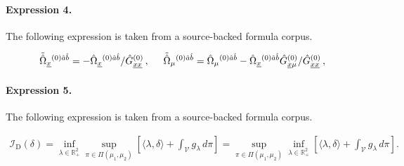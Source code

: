 \documentclass[11pt]{article}
\begin{document}
\paragraph{Expression 4.} The following expression is taken from a source-backed formula corpus.

\begin{align*}\tilde{\hat{\Omega}}_{\underline{x}}{}^{(0)\hat{a}\hat{b}} =-\hat{\Omega}_{\underline{x}}{}^{(0)\hat{a}\hat{b}} /\hat{G}_{\underline{xx}}^{(0)}\, ,\hspace{.5cm}\tilde{\hat{\Omega}}_{\mu}{}^{(0)\hat{a}\hat{b}} =\hat{\Omega}_{\mu}{}^{(0)\hat{a}\hat{b}}-\hat{\Omega}_{\underline{x}}{}^{(0)\hat{a}\hat{b}}\hat{G}_{\underline{x}\mu}^{(0)}/\hat{G}^{(0)}_{\underline{xx}}\, ,\end{align*}

\paragraph{Expression 5.} The following expression is taken from a source-backed formula corpus.

\begin{align*}\mathcal{I}_{\mathrm{D}} (\delta) = \inf _{\lambda \in \mathbb{R}_{+}^2} \sup _{\pi \in \Pi\left(\mu_1, \mu_2\right)} \left[\langle\lambda, \delta\rangle+\int_{\mathcal{V}} g_\lambda \, d \pi\right] = \sup _{\pi \in \Pi\left(\mu_1, \mu_2\right)} \inf _{\lambda \in \mathbb{R}_{+}^2}\left[\langle\lambda, \delta\rangle+\int_{\mathcal{V}} g_\lambda \, d \pi\right] .\end{align*}
\end{document}
